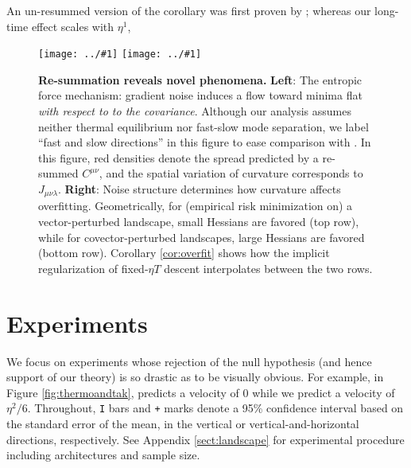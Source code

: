 \documentclass{article}
\theoremstyle{plain}
\theoremstyle{definition}
\newcommand{\plotmooh}[3]{\texttt{[image: ../\#1]}}
\begin{document}
        An un-resummed version of the corollary was first proven by
        \citet{ya19b}; whereas our long-time effect scales with $\eta^1$, 


        \begin{figure}[h!]
            \centering
            \plotmooh{diagrams/entropic-force-diagram}{}{0.32\columnwidth} 
            \plotmooh{diagrams/sharp}{}{0.31\columnwidth}
            \caption{
                {\bf Re-summation reveals novel phenomena.}
                {\bf Left}:
                    The entropic force mechanism: gradient noise induces a flow
                    toward minima flat \emph{with respect to to the
                    covariance}.  Although our analysis assumes neither thermal
                    equilibrium nor fast-slow mode separation, we label ``fast
                    and slow directions'' in this figure to ease comparison
                    with \citet{we19b}.  In this figure, red densities denote
                    the spread predicted by a re-summed $C^{\mu\nu}$, and
                    the spatial variation of curvature corresponds to
                    $J_{\mu\nu\lambda}$. 
                {\bf Right}:
                    Noise structure determines how curvature affects
                    overfitting.  Geometrically, for (empirical risk
                    minimization on) a vector-perturbed landscape, small
                    Hessians are favored (top row), while for
                    covector-perturbed landscapes, large Hessians are favored
                    (bottom row).  Corollary \ref{cor:overfit} shows how the
                    implicit regularization of fixed-$\eta T$ descent interpolates 
                    between the two rows.
            }
            \label{fig:cubicandspring}
        \end{figure}




\section{Experiments}

    We focus on experiments whose rejection of the null hypothesis (and hence
    support of our theory) is so drastic as to be visually obvious.  For
    example, in Figure \ref{fig:thermoandtak}, \citep{ch18} predicts a velocity
    of $0$ while we predict a velocity of $\eta^2/6$.  
    Throughout, \texttt{I} bars and \texttt{+} marks denote a 95\% confidence
    interval based on the standard error of the mean, in the vertical or
    vertical-and-horizontal directions, respectively.  See Appendix
    \ref{sect:landscape} for experimental procedure including architectures and
    sample size.
\end{document}
